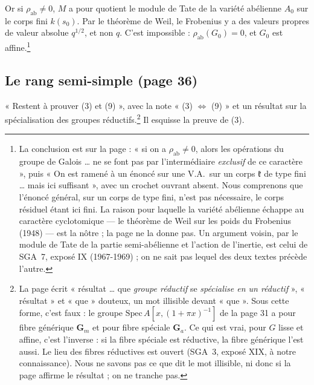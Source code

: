 \documentclass[11pt,a4paper]{article}
\begin{document}
Or si $\rho_{\mathrm{ab}} \neq 0$, $M$ a pour quotient le module de Tate de
la variété abélienne $A_{0}$ sur le corps fini $k(s_{0})$. Par le théorème de
Weil, le Frobenius y a des valeurs propres de valeur absolue $q^{1/2}$, et
non $q$. C'est impossible : $\rho_{\mathrm{ab}}(G_{0}) = 0$, et $G_{0}$ est
affine.\footnote{La conclusion est sur la page : « si on a $\rho_{\mathrm{ab}} \neq
0$, alors les opérations du groupe de Galois … ne se font pas par
l'intermédiaire \emph{exclusif} de ce caractère », puis « On est ramené à un
énoncé sur une V.A.\ sur un corps $\mathfrak{k}$ de type fini … mais ici
suffisant », avec un crochet ouvrant absent. Nous comprenons que l'énoncé
général, sur un corps de type fini, n'est pas nécessaire, le corps résiduel
étant ici fini. La raison pour laquelle la variété abélienne échappe au
caractère cyclotomique --- le théorème de Weil sur les poids du Frobenius
(1948) --- est la nôtre ; la page ne la donne pas. Un
argument voisin, par le module de Tate de la partie semi-abélienne et
l'action de l'inertie, est celui de SGA~7, exposé IX (1967-1969) ; on ne sait
pas lequel des deux textes précède l'autre.}

\subsection*{Le rang semi-simple (page 36)}

« Restent à prouver (3) et (9) », avec la note « (3) $\Leftrightarrow$ (9) »
et un résultat sur la spécialisation des groupes réductifs.\footnote{La page
écrit « résultat … que \emph{groupe réductif} se \emph{spécialise en un
réductif} », « résultat » et « que » douteux, un mot illisible devant
« que ». Sous cette forme, c'est faux : le groupe
$\mathrm{Spec}\, A[x, (1 + \pi x)^{-1}]$ de la page 31 a pour fibre générique
$\mathbf{G}_{m}$ et pour fibre spéciale $\mathbf{G}_{a}$. Ce qui est vrai, pour
$G$ lisse et affine, c'est l'inverse : si la fibre spéciale est réductive, la
fibre générique l'est aussi. Le lieu des fibres réductives est ouvert (SGA~3,
exposé XIX, à notre connaissance). Nous ne savons pas ce que dit le mot
illisible, ni donc si la page affirme le résultat ; on ne tranche pas.} Il esquisse la preuve de (3).
\end{document}
